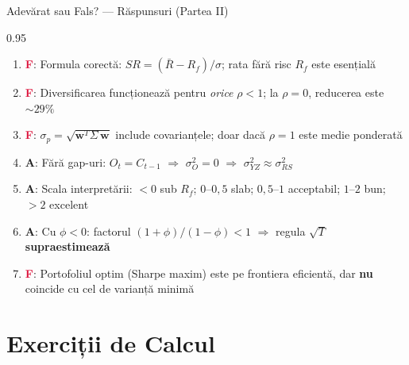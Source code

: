 \documentclass[9pt, aspectratio=169, t]{beamer}
\begin{document}
\begin{frame}[shrink=10]{Adevărat sau Fals? --- Răspunsuri (Partea II)}
\begin{cminipage}{0.95\textwidth}
    \footnotesize
    \begin{enumerate}\setlength{\itemsep}{1pt}
        \setcounter{enumi}{7}
        \item \textcolor{Crimson}{\textbf{F}}: Formula corectă: $SR = (\bar{R} - R_f)/\sigma$; rata fără risc $R_f$ este esențială
        \item \textcolor{Crimson}{\textbf{F}}: Diversificarea funcționează pentru \textit{orice} $\rho < 1$; la $\rho = 0$, reducerea este $\sim 29\%$
        \item \textcolor{Crimson}{\textbf{F}}: $\sigma_p = \sqrt{\mathbf{w}^T \Sigma\, \mathbf{w}}$ include covarianțele; doar dacă $\rho = 1$ este medie ponderată
        \item \textcolor{Forest}{\textbf{A}}: Fără gap-uri: $O_t = C_{t-1}$ $\Rightarrow$ $\sigma_O^2 = 0$ $\Rightarrow$ $\sigma_{YZ}^2 \approx \sigma_{RS}^2$
        \item \textcolor{Forest}{\textbf{A}}: Scala interpretării: $< 0$ sub $R_f$; $0$--$0{,}5$ slab; $0{,}5$--$1$ acceptabil; $1$--$2$ bun; $> 2$ excelent
        \item \textcolor{Forest}{\textbf{A}}: Cu $\phi < 0$: factorul $(1+\phi)/(1-\phi) < 1$ $\Rightarrow$ regula $\sqrt{T}$ \textbf{supraestimează}
        \item \textcolor{Crimson}{\textbf{F}}: Portofoliul optim (Sharpe maxim) este pe frontiera eficientă, dar \textbf{nu} coincide cu cel de varianță minimă
    \end{enumerate}
\end{cminipage}
\end{frame}

\section{Exerciții de Calcul}
\end{document}
